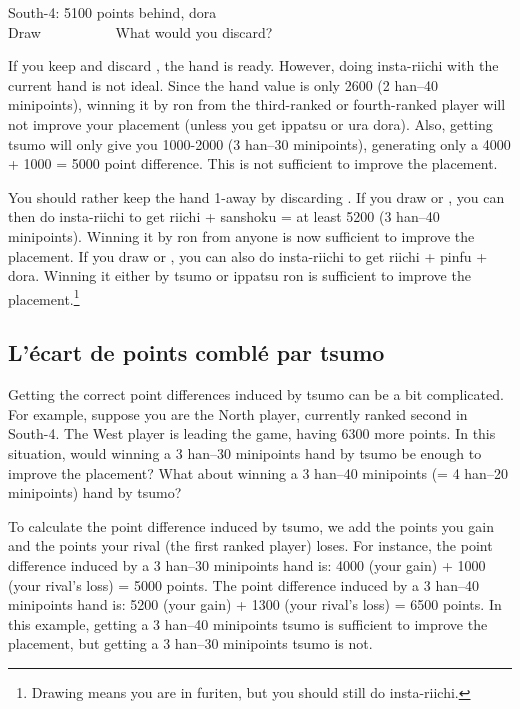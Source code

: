 \bigskip
\begin{itembox}[r]{South-4: 5100 points behind, {\jap dora} {\Large{}}}
\bp
{}~~\\
\hfill\footnotesize{Draw~~~~~~~~~~}
\ep
\vspace{-17pt}
What would you discard?
\end{itembox}
\noindent If you keep {\LARGE{}} and discard {\LARGE{}}, the hand is ready. However, doing insta-riichi with the current hand is not ideal. Since the hand value is only 2600 (2 {\jap han}--40 minipoints), winning it by {\jap ron} from the third-ranked or fourth-ranked player will not improve your placement (unless you get {\jap ippatsu} or {\jap ura dora}). Also, getting {\jap tsumo} will only give you 1000-2000 (3 {\jap han}--30 minipoints), generating only a 4000 + 1000 = 5000 point difference. This is not sufficient to improve the placement. 

\bigskip
You should rather keep the hand 1-away by discarding {\LARGE{}}. If you draw {\LARGE{}} or {\LARGE{}}, you can then do insta-riichi to get riichi + {\jap sanshoku} = at least 5200 (3 {\jap han}--40 minipoints). Winning it by {\jap ron} from anyone is now sufficient to improve the placement. If you draw {\LARGE{}} or {\LARGE{}}, you can also do insta-riichi to get riichi + {\jap pinfu} + {\jap dora}. Winning it either by {\jap tsumo} or {\jap ippatsu ron} is sufficient to improve the placement.\footnote{Drawing  means you are in {\jap furiten}, but you should still do insta-riichi.}

\subsection*{L'écart de points comblé par {\jap tsumo}}
Getting the correct point differences induced by {\jap tsumo} can be a bit complicated. For example, suppose you are the North player, currently ranked second in South-4. The West player is leading the game, having 6300 more points. In this situation, would winning a 3 {\jap han}--30 minipoints hand by {\jap tsumo} be enough to improve the placement? What about winning a 3 {\jap han}--40 minipoints (= 4 {\jap han}--20 minipoints) hand by {\jap tsumo}? 

\bigskip
To calculate the point difference induced by {\jap tsumo}, we add the points you gain and the points your rival (the first ranked player) loses. For instance, the point difference induced by a 3 {\jap han}--30 minipoints hand is: 4000 (your gain) + 1000 (your rival's loss) = 5000 points. The point difference induced by a 3 {\jap han}--40 minipoints hand is: 5200 (your gain) + 1300 (your rival's loss) = 6500 points. 
In this example, getting a 3 {\jap han}--40 minipoints {\jap tsumo} is sufficient to improve the placement, but getting a 3 {\jap han}--30 minipoints {\jap tsumo} is not. 

